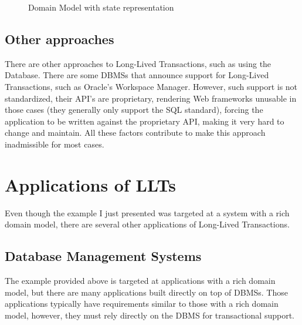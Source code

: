 \begin{figure}
  \centering

\caption{Domain Model with state representation}
\label{fig:courseDomainState}

\end{figure}

\subsection{Other approaches}

There are other approaches to Long-Lived Transactions, such as using
the Database. There are some DBMSs that announce support for
Long-Lived Transactions, such as Oracle's Workspace Manager. However,
such support is not standardized, their API's are proprietary,
rendering Web frameworks unusable in those cases (they generally only
support the SQL standard), forcing the application to be written
against the proprietary API, making it very hard to change and
maintain. All these factors contribute to make this approach
inadmissible for most cases.

\section{Applications of LLTs}

Even though the example I just presented was targeted at a system with
a rich domain model, there are several other applications of
Long-Lived Transactions.

\subsection{Database Management Systems}

The example provided above is targeted at applications with a rich
domain model, but there are many applications built directly on top of
DBMSs. Those applications typically have requirements similar to those
with a rich domain model, however, they must rely directly on the DBMS
for transactional support.


